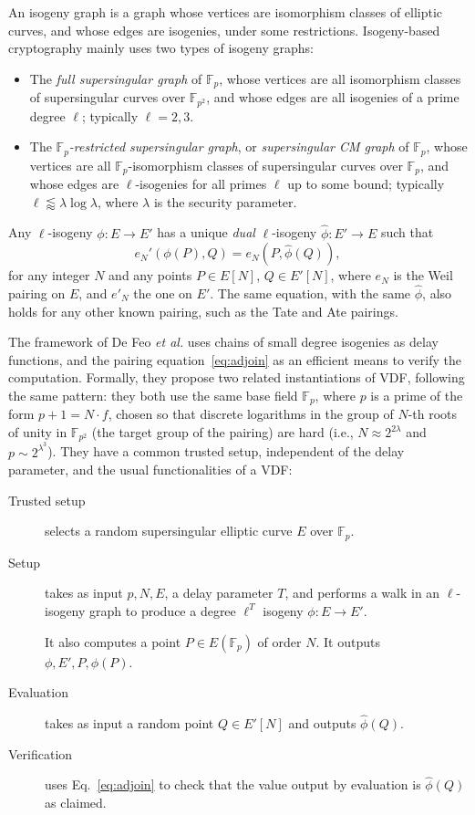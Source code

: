 \documentclass{llncs}
\newcommand{\F}{\mathbb{F}}
\begin{document}
An isogeny graph is a graph whose vertices are isomorphism classes of
elliptic curves, and whose edges are isogenies, under some
restrictions. %
Isogeny-based cryptography mainly uses two types of isogeny graphs:
\begin{itemize}
\item The \emph{full supersingular graph} of $\F_p$, whose vertices
  are all isomorphism classes of supersingular curves over $\F_{p^2}$,
  and whose edges are all isogenies of a prime degree $\ell$;
  typically $\ell=2,3$.
\item The \emph{$\F_p$-restricted supersingular graph}, or
  \emph{supersingular CM graph} of $\F_p$, whose vertices are all
  $\F_p$-isomorphism classes of supersingular curves over $\F_p$, and
  whose edges are $\ell$-isogenies for all primes $\ell$ up to some
  bound; typically $\ell\lessapprox\lambda\log\lambda$, where
  $\lambda$ is the security parameter.
\end{itemize}

Any $\ell$-isogeny $\phi:E\to E'$ has a unique \emph{dual}
$\ell$-isogeny $\hat\phi:E'\to E$ such that
\begin{equation}
  \label{eq:adjoin}
  e_N'(\phi(P),Q) = e_N(P,\hat\phi(Q)),
\end{equation}
for any integer $N$ and any points $P\in E[N]$, $Q\in E'[N]$, where
$e_N$ is the Weil pairing on $E$, and $e'_N$ the one on $E'$. %
The same equation, with the same $\hat\phi$, also holds for any other
known pairing, such as the Tate and Ate pairings.

The framework of De Feo \emph{et al.} uses chains of small degree
isogenies as delay functions, and the pairing
equation~\eqref{eq:adjoin} as an efficient means to verify the
computation. %
Formally, they propose two related instantiations of VDF, following
the same pattern: they both use the same base field $\F_p$, where $p$
is a prime of the form $p+1=N\cdot f$, chosen so that discrete
logarithms in the group of $N$-th roots of unity in $\F_{p^2}$ (the
target group of the pairing) are hard (i.e., $N\approx 2^{2\lambda}$
and $p\sim 2^{\lambda^3}$). %
They have a common trusted setup, independent of the delay parameter,
and the usual functionalities of a VDF:
\begin{description}
\item[Trusted setup] selects a random supersingular elliptic curve $E$
  over $\F_p$.
\item[Setup] takes as input $p,N,E$, a delay parameter $T$, and
  performs a walk in an $\ell$-isogeny graph to produce a degree
  $\ell^T$ isogeny $\phi:E\to E'$.
  
  It also computes a point $P\in E(\F_p)$ of order $N$. %
  It  outputs $\phi,E',P,\phi(P)$.
\item[Evaluation] takes as input a random point $Q\in E'[N]$ and outputs
  $\hat\phi(Q)$.
\item[Verification] uses Eq.~\eqref{eq:adjoin} to check that the value
  output by evaluation is $\hat\phi(Q)$ as claimed.
\end{description}
\end{document}
